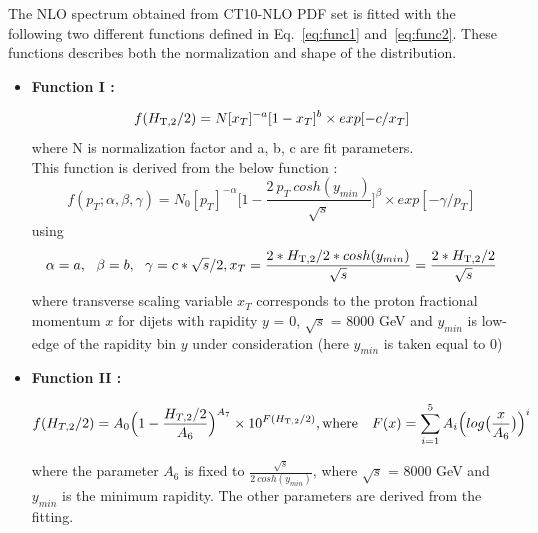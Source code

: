 The NLO spectrum obtained from CT10-NLO PDF set is fitted with the following two different functions defined in Eq.~\ref{eq:func1} and~\ref{eq:func2}. These functions describes both the normalization and shape of the distribution.  

\begin{itemize}
\item {\bf Function I : }

  \begin{equation}
    \label{eq:func1}
    f(H_{\mathrm{T,2}}/2) = N[x_{T}]^{-a}[1-x_{T}]^{b} \times exp[-c/x_{T}]
  \end{equation}
  where N is normalization factor and a, b, c are fit parameters.\\

  This function is derived from the below function \cite{CMS:2011ab} :
  \begin{equation}
    \label{eq:funcderive}
    f(p_{T};\alpha,\beta,\gamma) = N_{0}[p_{T}]^{-\alpha}\bigg[1-\frac{2~p_{T}~cosh(y_{min})}{\sqrt{s}}\bigg]^{\beta} \times exp[-\gamma/p_{T}]
  \end{equation}
  using 
  \begin{equation}
    \alpha = a,~~\beta = b,~~\gamma = c*\sqrt{s}/2, \\
    x_{T} = \frac{2*\httwons *cosh(y_{min})}{\sqrt{s}} = \frac{2*\httwons}{\sqrt{s}}
  \end{equation}
  where transverse scaling variable $x_{T}$ corresponds to the proton fractional momentum $x$ for dijets with rapidity $y$ = 0, $\sqrt{s}$ = 8000 GeV and $y_{min}$ is low-edge of the rapidity bin $y$ under consideration (here $y_{min}$ is taken equal to 0)
  
\item {\bf Function II : }

  \begin{equation}
    \label{eq:func2}
    f(H_{T,2}/2) = A_{0}\Big(1-\frac{H_{T,2}/2}{A_{6}}\Big)^{A_{7}} \times 10^{F(\httwo)}, {\rm where} ~~~{F(x) = \sum\limits_{i=1}^5 A_{i}\Big(log\big(\frac{x}{A_{6}}\big)\Big)^{i}}
  \end{equation}

  where the parameter $A_{6}$ is fixed to $\frac{\sqrt{s}}{2~cosh(y_{min})}$, where $\sqrt{s}$ = 8000 GeV and $y_{min}$ is 
  the minimum rapidity. The other parameters are derived from the fitting.
\end{itemize}

